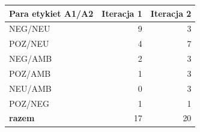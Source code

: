 \begin{tabular}{lrr}
\toprule
Para etykiet A1/A2 & Iteracja 1 & Iteracja 2 \\
\midrule
NEG/NEU & 9 & 3 \\
POZ/NEU & 4 & 7 \\
NEG/AMB & 2 & 3 \\
POZ/AMB & 1 & 3 \\
NEU/AMB & 0 & 3 \\
POZ/NEG & 1 & 1 \\
\midrule
\textbf{razem} & 17 & 20 \\
\bottomrule
\end{tabular}
